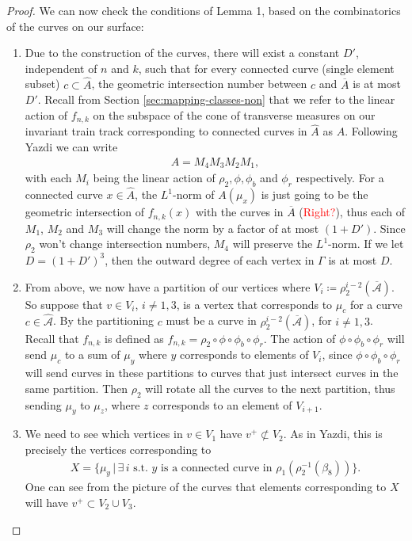 \begin{proof}
We can now check the conditions of Lemma 1, based on the combinatorics of the curves on our surface:
\begin{enumerate}
    \item Due to the construction of the curves, there will exist a constant $D'$, independent of $n$ and $k$, such that for every connected curve (single element subset) $c \subset \hat{A}$, the geometric intersection number between $c$ and $\overline{A}$ is at most $D'$.
    Recall from Section \ref{sec:mapping-classes-non} that we refer to the linear action of $f_{n,k}$ on the subspace of the cone of transverse measures on our invariant train track corresponding to connected curves in $\hat{A}$ as $A$. Following Yazdi we can write
    \begin{align*}
        A = M_4M_3M_2M_1,
    \end{align*}
    with each $M_i$ being the linear action of $\rho_2,\phi,\phi_b$ and $\phi_r$ respectively. For a connected curve $x \in \hat{A}$, the $L^1$-norm of $A(\mu_x)$ is just going to be the geometric intersection of $f_{n,k}(x)$ with the curves in $\overline{A}$ (\textcolor{red}{Right?}), thus each of $M_1$, $M_2$ and $M_3$ will change the norm by a factor of at most $(1 + D')$. Since $\rho_2$ won't change intersection numbers, $M_4$ will preserve the $L^1$-norm. If we let $D = (1 + D')^3$, then the outward degree of each vertex in $\Gamma$ is at most $D$.
    
    \item From above, we now have a partition of our vertices where $V_i \coloneqq \rho_2^{i-2}(\overline{\mathcal{A}})$. So suppose that $v \in V_i$, $i \neq 1,3$, is a vertex that corresponds to $\mu_c$ for a curve $c \in \hat{\mathcal{A}}$. By the partitioning $c$ must be a curve in $\rho_2^{i-2}(\overline{\mathcal{A}})$, for $i \neq 1,3$. Recall that $f_{n,k}$ is defined as $f_{n,k} = \rho_2 \circ \phi \circ \phi_b \circ \phi_r$. The action of $\phi \circ \phi_b \circ \phi_r$ will send $\mu_c$ to a sum of $\mu_y$ where $y$ corresponds to elements of $V_i$, since $\phi \circ \phi_b \circ \phi_r$ will send curves in these partitions to curves that just intersect curves in the same partition. Then $\rho_2$ will rotate all the curves to the next partition, thus sending $\mu_y$ to $\mu_z$, where $z$ corresponds to an element of $V_{i+1}$.
    
    \item We need to see which vertices in $v \in V_1$ have $v^+ \not\subset V_2$. As in Yazdi, this is precisely the vertices corresponding to
    \begin{align*}
        X = \{\mu_y \,\vert\, \exists \,i \text{ s.t. $y$ is a connected curve in } \rho_1(\rho_2^{-1}(\beta_8))\}.
    \end{align*}
    One can see from the picture of the curves that elements corresponding to $X$ will have $v^+ \subset V_2 \cup V_3$.
    

\end{enumerate}
\end{proof}
